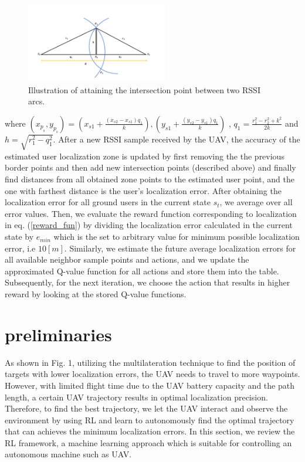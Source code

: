 \documentclass[journal,twocolumn]{IEEEtran}
\begin{document}
\begin{figure}[t]
\vspace{-10pt}
  \centering
  \includegraphics[width=0.55\textwidth]{Figures/fig_4.pdf}
    \vspace*{-1mm}
  \caption{Illustration of attaining the intersection point between two RSSI arcs.}\label{fig.fig_4}
\end{figure}

where $({x_p__0},{y_p__0}) = (x_{s1} + \frac{(x_{s2}-x_{s1})q_{1}}{k}) , (y_{s1} + \frac{(y_{s2}-y_{s1})q_{1}}{k})$ , $q_1 = \frac{r_1^2 - r_2^2 + k^2}{2k}$ and $h = \sqrt{r_1^2 - q_1^2}$.
After a new RSSI sample received by the UAV, the accuracy of the estimated user localization zone is updated by first removing the the previous border points and then add new intersection points (described above) and finally find distances from all obtained zone points to the estimated user point, and the one with farthest distance is the user's localization error. After obtaining the localization error for all ground users in the current state $s_t$, we average over all error values. Then, we evaluate the reward function corresponding to localization in eq. (\ref{reward_fun}) by dividing the localization error calculated in the current state by $e_{min}$ which is the set to arbitrary value for minimum possible localization error, i.e $10[m]$. Similarly, we estimate the future average localization errors for all available neighbor sample points and actions, and we update the approximated Q-value function for all actions and store them into the table. Subsequently, for the next iteration, we choose the action that results in higher reward by looking at the stored Q-value functions.





\section{preliminaries}


As shown in Fig. 1, utilizing the multilateration technique to find the position of targets with lower localization errors, the UAV needs to travel to more waypoints. However, with limited flight time due to the UAV battery capacity and the path length, a certain UAV trajectory results in optimal localization precision. Therefore, to find the best trajectory, we let the UAV interact and observe the environment by using RL and learn to autonomously find the optimal trajectory that can achieves the minimum localization errors. In this section, we review the RL framework, a machine learning approach which is suitable for controlling an autonomous machine such as UAV.
\end{document}
